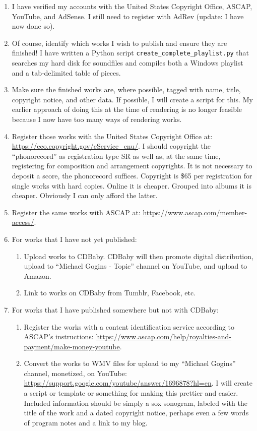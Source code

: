 \documentclass[english,11pt,letterpaper,onecolumn]{scrartcl}
\begin{document}
\begin{enumerate}
\item I have verified my accounts with the United States Copyright Office, ASCAP, YouTube, and AdSense. I still need to register with AdRev (update: I have now done so).
\item Of course, identify which works I wish to publish and ensure they are finished! I have written a Python script \texttt{create\_complete\_playlist.py} that searches my hard disk for soundfiles and compiles both a Windows playlist and a tab-delimited table of pieces.
\item Make sure the finished works are, where possible, tagged with name, title, copyright notice, and other data. If possible, I will create a script for this. My earlier approach of doing this at the time of rendering is no longer feasible because I now have too many ways of rendering works.
\item Register those works with the United States Copyright Office at: \url{https://eco.copyright.gov/eService_enu/}. I should copyright  the ``phonorecord'' as registration type SR as well as, at the same time, registering for composition and arrangement copyrights. It is not necessary to deposit a score, the phonorecord suffices. Copyright is \$65 per registration for single works with hard copies. Online it is cheaper. Grouped into albums it is cheaper. Obviously I can only afford the latter.
\item Register the same works with ASCAP at: \url{https://www.ascap.com/member-access/}. 
\item For works that I have not yet published:
\begin{enumerate}
	\item Upload works to CDBaby. CDBaby will then promote digital distribution, upload to ``Michael Gogins - Topic'' channel on YouTube, and upload to Amazon.
	\item Link to works on CDBaby from Tumblr, Facebook, etc.
\end{enumerate}
\item For works that I have published somewhere but not with CDBaby:
\begin{enumerate}
	\item Register the works with a content identification service according to ASCAP's instructions: \url{https://www.ascap.com/help/royalties-and-payment/make-money-youtube}. 
	\item Convert the works to WMV files for upload to my ``Michael Gogins'' channel, monetized, on YouTube: \url{https://support.google.com/youtube/answer/1696878?hl=en}. I will create a script or template or something for making this prettier and easier. Included information should be simply a sox sonogram, labeled with the title of the work and a dated copyright notice, perhaps even a few words of program notes and a link to my blog.
\end{enumerate}
\end{enumerate}
\end{document}
